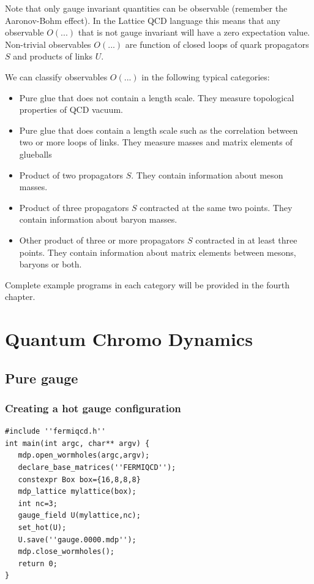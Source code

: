 Note that only gauge invariant quantities can be observable (remember the
Aaronov-Bohm effect). In the Lattice QCD language this means that any
observable $O(...)$ that is not gauge invariant will have a zero expectation
value. Non-trivial observables $O(...)$ are function of closed loops of
quark propagators $S$ and products of links $U$.

We can classify observables $O(...)$ in the following typical categories:

\begin{itemize}
\item  Pure glue that does not contain a length scale. They measure
topological properties of QCD vacuum.

\item  Pure glue that does contain a length scale such as the correlation
between two or more loops of links. They measure masses and matrix elements
of glueballs

\item  Product of two propagators $S$. They contain information about meson
masses.

\item  Product of three propagators $S$ contracted at the same two points.
They contain information about baryon masses.

\item  Other product of three or more propagators $S$ contracted in at least
three points. They contain information about matrix elements between mesons,
baryons or both.
\end{itemize}

Complete example programs in each category will be provided in the fourth
chapter.

\section{Quantum Chromo Dynamics}

\subsection{Pure gauge}

\subsubsection{Creating a hot gauge configuration}
\begin{verbatim}
#include ''fermiqcd.h''
int main(int argc, char** argv) {
   mdp.open_wormholes(argc,argv);
   declare_base_matrices(''FERMIQCD'');
   constexpr Box box={16,8,8,8}
   mdp_lattice mylattice(box);
   int nc=3;
   gauge_field U(mylattice,nc);
   set_hot(U);
   U.save(''gauge.0000.mdp'');
   mdp.close_wormholes();
   return 0;
}
\end{verbatim}

